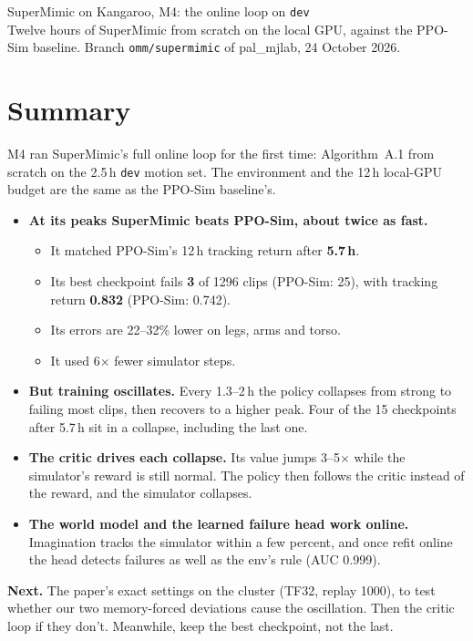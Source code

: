 \documentclass[10pt]{article}
\begin{document}
\sloppy

\begin{center}
{\LARGE SuperMimic on Kangaroo, M4: the online loop on \texttt{dev}}\\[4pt]
Twelve hours of SuperMimic from scratch on the local GPU, against the PPO-Sim baseline. Branch
\texttt{omm/supermimic} of pal\_mjlab, 24 October 2026.
\end{center}

\section*{Summary}

M4 ran SuperMimic's full online loop for the first time: Algorithm~A.1 from scratch on the 2.5\,h
\texttt{dev} motion set. The environment and the 12\,h local-GPU budget are the same as the PPO-Sim
baseline's.

\begin{itemize}
  \item \textbf{At its peaks SuperMimic beats PPO-Sim, about twice as fast.}
  \begin{itemize}
    \item It matched PPO-Sim's 12\,h tracking return after \textbf{5.7\,h}.
    \item Its best checkpoint fails \textbf{3} of 1296 clips (PPO-Sim: 25), with tracking return
    \textbf{0.832} (PPO-Sim: 0.742).
    \item Its errors are 22--32\% lower on legs, arms and torso.
    \item It used 6$\times$ fewer simulator steps.
  \end{itemize}
  \item \textbf{But training oscillates.} Every 1.3--2\,h the policy collapses from strong to failing
  most clips, then recovers to a higher peak. Four of the 15 checkpoints after 5.7\,h sit in a
  collapse, including the last one.
  \item \textbf{The critic drives each collapse.} Its value jumps 3--5$\times$ while the simulator's
  reward is still normal. The policy then follows the critic instead of the reward, and the simulator
  collapses.
  \item \textbf{The world model and the learned failure head work online.} Imagination tracks the
  simulator within a few percent, and once refit online the head detects failures as well as the env's
  rule (AUC 0.999).
\end{itemize}

\textbf{Next.} The paper's exact settings on the cluster (TF32, replay 1000), to test whether our two
memory-forced deviations cause the oscillation. Then the critic loop if they don't. Meanwhile, keep the
best checkpoint, not the last.
\end{document}
